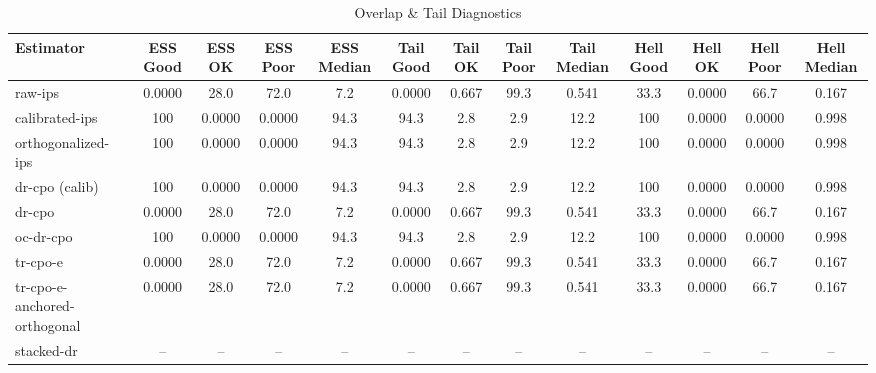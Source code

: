\begin{table}[htbp]
\centering
\caption{Overlap & Tail Diagnostics}
\label{tab:A3}
\begin{tabular}{l|cccccccccccc}
\toprule
Estimator & ESS Good & ESS OK & ESS Poor & ESS Median & Tail Good & Tail OK & Tail Poor & Tail Median & Hell Good & Hell OK & Hell Poor & Hell Median \\
\midrule
raw-ips & 0.0000 & 28.0 & 72.0 & 7.2 & 0.0000 & 0.667 & 99.3 & 0.541 & 33.3 & 0.0000 & 66.7 & 0.167 \\
calibrated-ips & 100 & 0.0000 & 0.0000 & 94.3 & 94.3 & 2.8 & 2.9 & 12.2 & 100 & 0.0000 & 0.0000 & 0.998 \\
orthogonalized-ips & 100 & 0.0000 & 0.0000 & 94.3 & 94.3 & 2.8 & 2.9 & 12.2 & 100 & 0.0000 & 0.0000 & 0.998 \\
dr-cpo (calib) & 100 & 0.0000 & 0.0000 & 94.3 & 94.3 & 2.8 & 2.9 & 12.2 & 100 & 0.0000 & 0.0000 & 0.998 \\
dr-cpo & 0.0000 & 28.0 & 72.0 & 7.2 & 0.0000 & 0.667 & 99.3 & 0.541 & 33.3 & 0.0000 & 66.7 & 0.167 \\
oc-dr-cpo & 100 & 0.0000 & 0.0000 & 94.3 & 94.3 & 2.8 & 2.9 & 12.2 & 100 & 0.0000 & 0.0000 & 0.998 \\
tr-cpo-e & 0.0000 & 28.0 & 72.0 & 7.2 & 0.0000 & 0.667 & 99.3 & 0.541 & 33.3 & 0.0000 & 66.7 & 0.167 \\
tr-cpo-e-anchored-orthogonal & 0.0000 & 28.0 & 72.0 & 7.2 & 0.0000 & 0.667 & 99.3 & 0.541 & 33.3 & 0.0000 & 66.7 & 0.167 \\
stacked-dr & -- & -- & -- & -- & -- & -- & -- & -- & -- & -- & -- & -- \\
\bottomrule
\end{tabular}
\end{table}